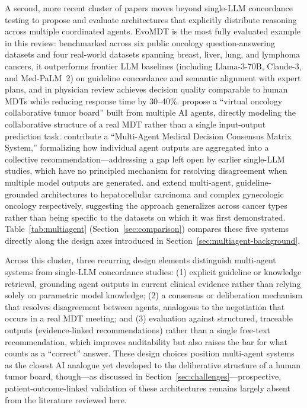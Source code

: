 \documentclass[acmsmall,screen=true,review=false,nonacm=true]{acmart}
\begin{document}
A second, more recent cluster of papers moves beyond single-LLM concordance testing to propose and evaluate architectures that explicitly distribute reasoning across multiple coordinated agents. EvoMDT \citep{liu2026} is the most fully evaluated example in this review: benchmarked across six public oncology question-answering datasets and four real-world datasets spanning breast, liver, lung, and lymphoma cancers, it outperforms frontier LLM baselines (including Llama-3-70B, Claude-3, and Med-PaLM~2) on guideline concordance and semantic alignment with expert plans, and in physician review achieves decision quality comparable to human MDTs while reducing response time by 30--40\%. \citet{wang2025jco} propose a ``virtual oncology collaborative tumor board'' built from multiple AI agents, directly modeling the collaborative structure of a real MDT rather than a single input-output prediction task. \citet{han2025} contribute a ``Multi-Agent Medical Decision Consensus Matrix System,'' formalizing how individual agent outputs are aggregated into a collective recommendation---addressing a gap left open by earlier single-LLM studies, which have no principled mechanism for resolving disagreement when multiple model outputs are generated. \citet{saenz2026} and \citet{kuerbanjiang2025} extend multi-agent, guideline-grounded architectures to hepatocellular carcinoma and complex gynecologic oncology respectively, suggesting the approach generalizes across cancer types rather than being specific to the datasets on which it was first demonstrated. Table~\ref{tab:multiagent} (Section~\ref{sec:comparison}) compares these five systems directly along the design axes introduced in Section~\ref{sec:multiagent-background}.

Across this cluster, three recurring design elements distinguish multi-agent systems from single-LLM concordance studies: (1) explicit guideline or knowledge retrieval, grounding agent outputs in current clinical evidence rather than relying solely on parametric model knowledge; (2) a consensus or deliberation mechanism that resolves disagreement between agents, analogous to the negotiation that occurs in a real MDT meeting; and (3) evaluation against structured, traceable outputs (evidence-linked recommendations) rather than a single free-text recommendation, which improves auditability but also raises the bar for what counts as a ``correct'' answer. These design choices position multi-agent systems as the closest AI analogue yet developed to the deliberative structure of a human tumor board, though---as discussed in Section~\ref{sec:challenges}---prospective, patient-outcome-linked validation of these architectures remains largely absent from the literature reviewed here.
\end{document}
